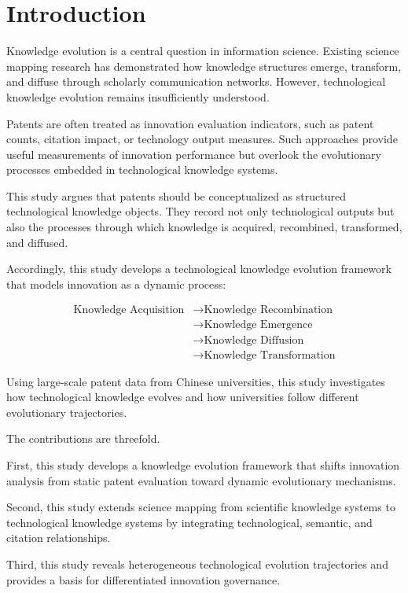 
\section{Introduction}

Knowledge evolution is a central question in information science. Existing science mapping research has demonstrated how knowledge structures emerge, transform, and diffuse through scholarly communication networks. However, technological knowledge evolution remains insufficiently understood.

Patents are often treated as innovation evaluation indicators, such as patent counts, citation impact, or technology output measures. Such approaches provide useful measurements of innovation performance but overlook the evolutionary processes embedded in technological knowledge systems.

This study argues that patents should be conceptualized as structured technological knowledge objects. They record not only technological outputs but also the processes through which knowledge is acquired, recombined, transformed, and diffused.

Accordingly, this study develops a technological knowledge evolution framework that models innovation as a dynamic process:

\begin{align*}
\text{Knowledge Acquisition} &\rightarrow \text{Knowledge Recombination}\\
&\rightarrow \text{Knowledge Emergence}\\
&\rightarrow \text{Knowledge Diffusion}\\
&\rightarrow \text{Knowledge Transformation}
\end{align*}

Using large-scale patent data from Chinese universities, this study investigates how technological knowledge evolves and how universities follow different evolutionary trajectories.

The contributions are threefold.

First, this study develops a knowledge evolution framework that shifts innovation analysis from static patent evaluation toward dynamic evolutionary mechanisms.

Second, this study extends science mapping from scientific knowledge systems to technological knowledge systems by integrating technological, semantic, and citation relationships.

Third, this study reveals heterogeneous technological evolution trajectories and provides a basis for differentiated innovation governance.

